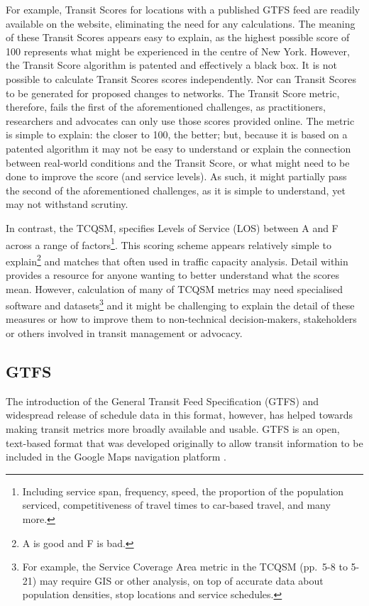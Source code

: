 \documentclass[preprint, 3p,
authoryear]{elsarticle} %
\begin{document}
For example, Transit Scores for locations with a published GTFS feed are
readily available on the \citet{WalkScore:2023tg} website, eliminating
the need for any calculations. The meaning of these Transit Scores
appears easy to explain, as the highest possible score of 100 represents
what might be experienced in the centre of New York. However, the
Transit Score algorithm is patented and effectively a black box. It is
not possible to calculate Transit Scores scores independently. Nor can
Transit Scores to be generated for proposed changes to networks. The
Transit Score metric, therefore, fails the first of the aforementioned
challenges, as practitioners, researchers and advocates can only use
those scores provided online. The metric is simple to explain: the
closer to 100, the better; but, because it is based on a patented
algorithm it may not be easy to understand or explain the connection
between real-world conditions and the Transit Score, or what might need
to be done to improve the score (and service levels). As such, it might
partially pass the second of the aforementioned challenges, as it is
simple to understand, yet may not withstand scrutiny.

In contrast, the TCQSM, specifies Levels of Service (LOS) between A and
F across a range of factors\footnote{ Including service span, frequency,
  speed, the proportion of the population serviced, competitiveness of
  travel times to car-based travel, and many more.}. This scoring scheme
appears relatively simple to explain\footnote{ A is good and F is bad.}
and matches that often used in traffic capacity analysis. Detail within
\citet{TCQSM:2013} provides a resource for anyone wanting to better
understand what the scores mean. However, calculation of many of TCQSM
metrics may need specialised software and datasets\footnote{ For
  example, the Service Coverage Area metric in the TCQSM (pp.~5-8 to
  5-21) may require GIS or other analysis, on top of accurate data about
  population densities, stop locations and service schedules.} and it
might be challenging to explain the detail of these measures or how to
improve them to non-technical decision-makers, stakeholders or others
involved in transit management or advocacy.

\hypertarget{gtfs}{%
\subsection{GTFS}\label{gtfs}}

The introduction of the General Transit Feed Specification (GTFS) and
widespread release of schedule data in this format, however, has helped
towards making transit metrics more broadly available and usable. GTFS
is an open, text-based format that was developed originally to allow
transit information to be included in the Google Maps navigation
platform \citep{GTFS}.
\end{document}
